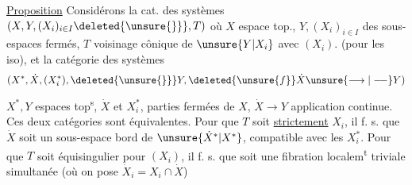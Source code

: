 \uline{Proposition} Considérons la cat. des
systèmes $(X,Y,(X_i)_{i\in I}\deleted{\unsure{\}}},T)$ où
$X$ espace top., $Y,(X_i)_{i\in I}$ des sous-espaces fermés,
$T$ voisinage cônique de $\unsure{Y|X_i}$
 avec
$(X_i)$. (pour les iso), et la catégorie
des systèmes
\[
(X^*,\dot X,(X_i^*),\deleted{\unsure{\}}}Y,
\deleted{\unsure{f}}\dot X\unsure{\longrightarrow|\mathrel{\relbar\joinrel\relbar}}Y)
\]
$X^*,Y$ espaces top\textsuperscript{s}, $\dot X$ et $X_i^*$, parties fermées de $X$,
$\dot X\longrightarrow Y$ application continue. Ces deux
catégories sont équivalentes.
Pour que $T$
soit \uline{strictement} 
 $X_i$,
il f.  s. que $\dot X$ soit un sous-espace bord
de $\unsure{\dot X^*|X^*}$,  compatible avec les $X_i^*$.
Pour que $T$ soit équisingulier pour
$(X_i)$, il f.  s. que
soit une fibration localem\textsuperscript{t} triviale
simultanée (où on pose $\dot X_i=X_i\cap\dot X$)
